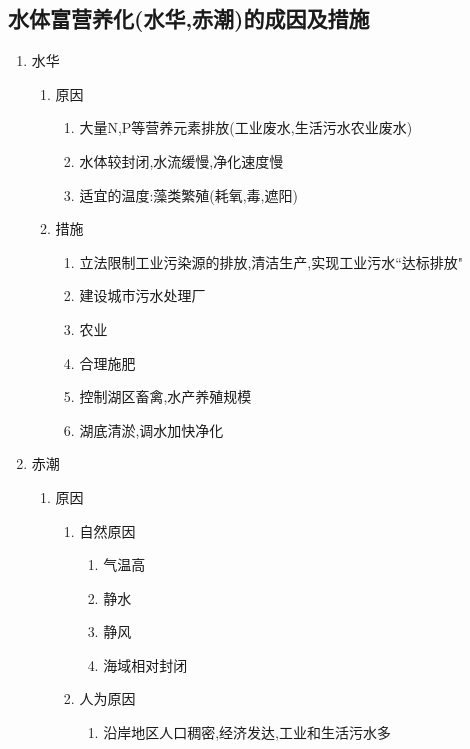 \documentclass[a4paper]{article}
\begin{document}
    \subsection{水体富营养化(水华,赤潮)的成因及措施}
    \begin{enumerate}
        \item 水华
        \begin{enumerate}
            \item 原因
            \begin{enumerate}
                \item 大量N,P等营养元素排放(工业废水,生活污水农业废水)
                \item 水体较封闭,水流缓慢,净化速度慢
                \item 适宜的温度:藻类繁殖(耗氧,毒,遮阳)
            \end{enumerate}
            \item 措施
            \begin{enumerate}
                \item 立法限制工业污染源的排放,清洁生产,实现工业污水“达标排放"
                \item 建设城市污水处理厂
                \item 农业
                \item 合理施肥
                \item 控制湖区畜禽,水产养殖规模
                \item 湖底清淤,调水加快净化
            \end{enumerate}
        \end{enumerate}
        \item 赤潮
        \begin{enumerate}
            \item 原因
            \begin{enumerate} %
                \item 自然原因
                \begin{enumerate}
                    \item 气温高
                    \item 静水
                    \item 静风
                    \item 海域相对封闭
                \end{enumerate}
                \item 人为原因
                \begin{enumerate}
                    \item 沿岸地区人口稠密,经济发达,工业和生活污水多

\end{enumerate}
\end{enumerate}
\end{enumerate}
\end{enumerate}
\end{document}
